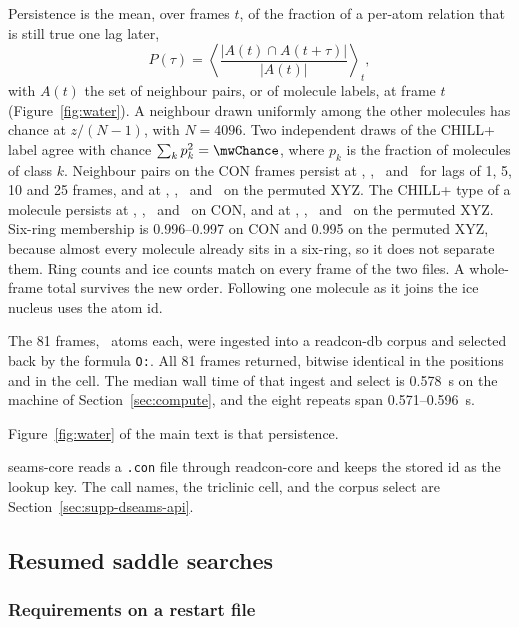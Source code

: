 Persistence is the mean, over frames \(t\), of the fraction of a per-atom relation that is still true one lag later,
\begin{equation}
\label{eq:persist}
P(\tau)=\left\langle\frac{|A(t)\cap A(t+\tau)|}{|A(t)|}\right\rangle_{t},
\end{equation}
with \(A(t)\) the set of neighbour pairs, or of molecule labels, at frame \(t\) (Figure~\ref{fig:water}).
A neighbour drawn uniformly among the other molecules has chance at \(z/(N-1)\), with \(N=4096\).
Two independent draws of the CHILL+ label agree with chance \(\sum_k p_k^{2}=\mwChance\), where \(p_k\) is the fraction of molecules of class \(k\).
Neighbour pairs on the CON frames persist at \mwConOne, \mwConFive, \mwConTen\ and \mwConTwentyFive\ for lags of 1, 5, 10 and 25 frames, and at \mwXyzOne, \mwXyzFive, \mwXyzTen\ and \mwXyzTwentyFive\ on the permuted XYZ.
The CHILL+ type of a molecule persists at \mwIceConOne, \mwIceConFive, \mwIceConTen\ and \mwIceConTwentyFive\ on CON, and at \mwIceXyzOne, \mwIceXyzFive, \mwIceXyzTen\ and \mwIceXyzTwentyFive\ on the permuted XYZ.
Six-ring membership is 0.996--0.997 on CON and 0.995 on the permuted XYZ, because almost every molecule already sits in a six-ring, so it does not separate them.
Ring counts and ice counts match on every frame of the two files.
A whole-frame total survives the new order.
Following one molecule as it joins the ice nucleus uses the atom id.

The 81 frames, \mwMolecules\ atoms each, were ingested into a readcon-db corpus and selected back by the formula \texttt{O:\mwMolecules}.
All 81 frames returned, bitwise identical in the positions and in the cell.
The median wall time of that ingest and select is 0.578~s on the machine of Section~\ref{sec:compute}, and the eight repeats span 0.571--0.596~s.

Figure~\ref{fig:water} of the main text is that persistence.


seams-core reads a \texttt{.con} file through readcon-core and keeps the stored id as the lookup key.
The call names, the triclinic cell, and the corpus select are Section~\ref{sec:supp-dseams-api}.

\subsection{Resumed saddle searches}
\subsubsection{Requirements on a restart file}

